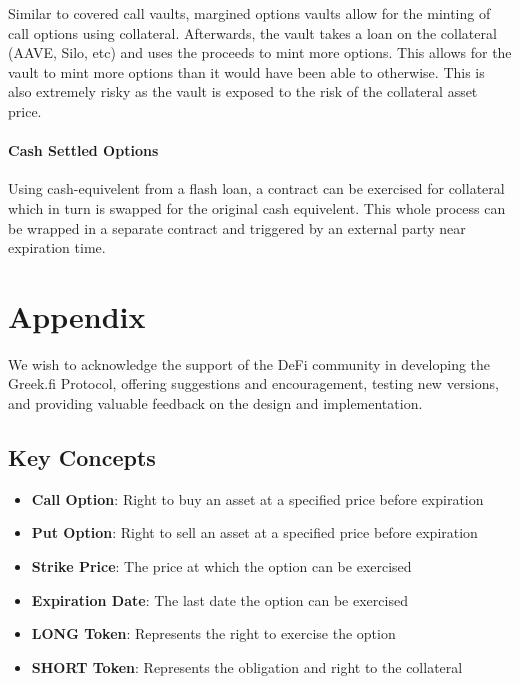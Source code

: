Similar to covered call vaults, margined options vaults allow for the
minting of call options using collateral. Afterwards, the vault takes a
loan on the collateral (AAVE, Silo, etc) and uses the proceeds to mint
more options. This allows for the vault to mint more options than it
would have been able to otherwise. This is also extremely risky as the 
vault is exposed to the risk of the collateral asset price.

\paragraph*{Cash Settled Options} 

Using cash-equivelent from a flash loan, 
a contract can be exercised for collateral which 
in turn is swapped for the original cash equivelent.
This whole process can be wrapped in a separate contract
and triggered by an external party near expiration time.

\section{\label{sec:appendix}Appendix}


\begin{acknowledgments}
We wish to acknowledge the support of the DeFi community in developing
the Greek.fi Protocol, offering suggestions and encouragement, testing new versions,
and providing valuable feedback on the design and implementation.
\end{acknowledgments}

\appendix

\subsection{Key Concepts}

\begin{itemize}
\item
  \textbf{Call Option}: Right to buy an asset at a specified price
  before expiration
\item
  \textbf{Put Option}: Right to sell an asset at a specified price
  before expiration
\item
  \textbf{Strike Price}: The price at which the option can be exercised
\item
  \textbf{Expiration Date}: The last date the option can be exercised
\item
  \textbf{LONG Token}: Represents the right to exercise the option
\item
  \textbf{SHORT Token}: Represents the obligation and right to the
  collateral
\end{itemize}

